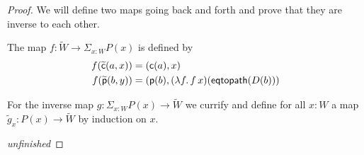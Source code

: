 \begin{proof}
  We will define two maps going back and forth and prove that they are inverse
  to each other.

  The map $f:\widetilde{W}\to\Sigma_{x:W}P(x)$ is defined by
  \begin{align*}
    f(\widetilde{\mathsf{c}}(a,x)) &= (\mathsf{c}(a),x) \\
    {f}\!\left({\widetilde{\mathsf{p}}(b,y)}\right) &= (\mathsf{p}(b),{(\lambda{}f.\,f\,x)}\!\left({\mathsf{eqtopath}(D(b))}\right)
  \end{align*}

  For the inverse map $g:\Sigma_{x:W}P(x)\to\widetilde{W}$ we currify and define
  for all $x:W$ a map $\widetilde{g}_x:P(x)\to\widetilde{W}$ by induction on
  $x$.

  \emph{unfinished}
\end{proof}


